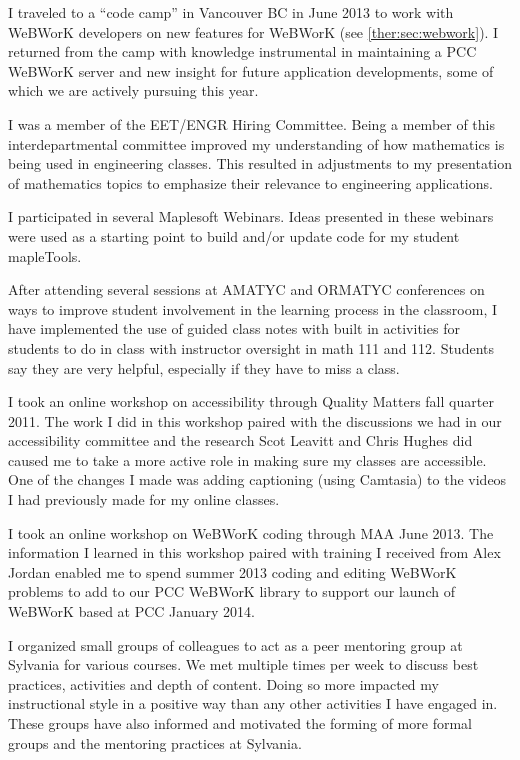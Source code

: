 \begin{description}[style=nextline]
	I traveled to a ``code camp'' in Vancouver BC in June 2013 to work with WeBWorK
	developers on new features for WeBWorK (see \vref{ther:sec:webwork}).  I returned
	from the camp with knowledge instrumental in maintaining a PCC WeBWorK server
	and new insight for future application developments, some of which we are
	actively pursuing this year.

	\item[Kenneth Kidoguchi (Full time Instructor, Sylvania Campus)]
	I was a member of the EET/ENGR Hiring Committee.  Being a member of this
	interdepartmental committee improved my understanding of how mathematics is
	being used in engineering classes.  This resulted in adjustments to my
	presentation of mathematics topics to emphasize their relevance to engineering
	applications.

	I participated in several Maplesoft Webinars.  Ideas presented in these
	webinars were used as a starting point to build and/or update code for my
	student mapleTools.

	\item[Jerry Kissick (Faculty Chair, Rock Creek Campus)]
	After attending several sessions at AMATYC and ORMATYC conferences on ways to
	improve student involvement in the learning process in the classroom, I have
	implemented the use of guided class notes with built in activities for students
	to do in class with instructor oversight in math 111 and 112. Students say they
	are very helpful, especially if they have to miss a class.

	\item[Kandace Kling (Full-time Instructor, Sylvania Campus)]
	I took an online workshop on accessibility through Quality Matters fall quarter
	2011. The work I did in this workshop paired with the discussions we had in our
	accessibility committee and the research Scot Leavitt and Chris Hughes did
	caused me to take a more active role in making sure my classes are accessible.
	One of the changes I made was adding captioning (using Camtasia) to the videos
	I had previously made for my online classes.

	I took an online workshop on WeBWorK coding through MAA June 2013. The
	information I learned in this workshop paired with training I received from
	Alex Jordan enabled me to spend summer 2013 coding and editing WeBWorK problems
	to add to our PCC WeBWorK library to support our launch of WeBWorK based at PCC
	January 2014.

	\item[Ross Kouzes (Full-time Instructor, Sylvania Campus)]
	I organized small groups of colleagues to act as a peer mentoring group at
	Sylvania for various courses. We met multiple times per week to discuss best
	practices, activities and depth of content. Doing so more impacted my
	instructional style in a positive way than any other activities I have engaged
	in. These groups have also informed and motivated the forming of more formal
	groups and the mentoring practices at Sylvania.


\end{description}
